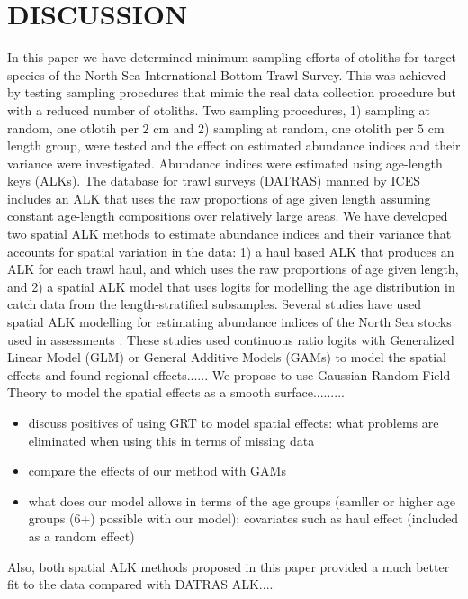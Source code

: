 \documentclass[a4paper 12pt]{article}
\numberwithin{equation}{section}
\begin{document}
\clearpage

\section{DISCUSSION}
\label{sec:discussion}

In this paper we have determined minimum sampling efforts of otoliths for target species of the North Sea International Bottom Trawl Survey. This was achieved by testing sampling procedures that mimic the real data collection procedure but with a reduced number of otoliths. Two sampling procedures, 1) sampling at random, one otlotih per $2$ cm and 2) sampling at random, one otolith per $5$ cm length group, were tested and the effect on estimated abundance indices and their variance were investigated. Abundance indices were estimated using age-length keys (ALKs). The database for trawl surveys (DATRAS) manned by ICES includes an ALK that uses the raw proportions of age given length assuming constant age-length compositions over relatively large areas. We have developed two spatial ALK methods  to estimate abundance indices and their variance that accounts for spatial variation in the data: 1) a haul based ALK that produces an ALK for each trawl haul, and which uses the raw proportions of age given length, and 2) a spatial ALK model that uses logits for modelling the age distribution in catch data from the length-stratified  subsamples. Several studies have used spatial ALK modelling for estimating abundance indices of the North Sea stocks used in  assessments \citep{berg2012spatial, berg2014evaluation, gerritsen2006simple}. These studies used continuous ratio logits with Generalized Linear Model (GLM) or General Additive Models (GAMs) to model the spatial effects and found regional effects...... We propose to use Gaussian Random Field Theory to model the spatial effects as a smooth surface.........
\begin{itemize}
\item discuss positives of using GRT to model spatial effects: what problems are eliminated when using this in terms of missing data
\item compare the effects of our method with GAMs \citep{berg2012spatial}
\item what does our model allows in terms of the age groups (samller or higher age groups (6+) possible with our model); covariates such as haul effect (included as a random effect)
\end{itemize}
Also, both spatial ALK methods proposed in this paper provided a much better fit to the data compared with DATRAS ALK....
\end{document}
